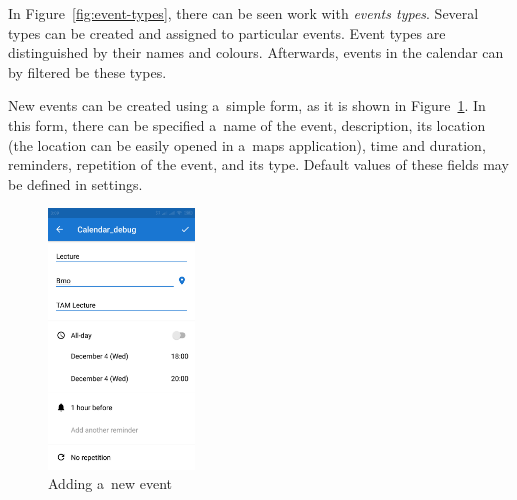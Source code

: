 \documentclass[a4paper, 11pt]{article}
\begin{document}
	In Figure~\ref{fig:event-types}, there can be seen work with
	\emph{events types}. Several types can be created and assigned to
	particular events. Event types are distinguished by their names
	and colours. Afterwards, events in the calendar can by filtered
	be these types.

	New events can be created using a~simple form, as it is shown in
	Figure~\ref{fig:add-event}. In this form, there can be specified
	a~name of the event, description, its location (the location can
	be easily opened in a~maps application), time and duration,
	reminders, repetition of the event, and its type. Default values
	of these fields may be defined in settings.

	\begin{figure}[H]
		\centering

		\begin{minipage}{.24 \textwidth}
			\centering
			\includegraphics[width=10.5em, frame]{img/add_event.png}
			\caption{Adding a~new event}
			\label{fig:add-event}
		\end{minipage}
%
		\begin{minipage}{.74 \textwidth}
			\centering


\end{minipage}
\end{figure}
\end{document}
